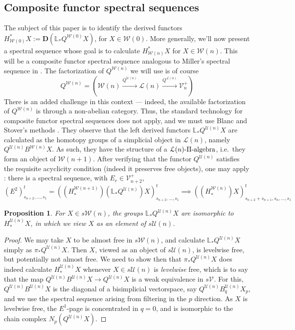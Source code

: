 \documentclass[11pt]{amsart}
\theoremstyle{plain}
\newtheorem{prop}[thm]{Proposition}
\theoremstyle{definition}
\renewcommand{\to}{\longrightarrow}
\newcommand{\calW}{\mathcal{W}}
\newcommand{\calU}{\mathcal{U}}
\newcommand{\calL}{\mathcal{L}}
\newcommand{\calV}{\mathcal{V}}
\theoremstyle{plain}
\newcommand{\vect}[2]{\calV^{#1}_{#2}}
\newcommand{\dual}{\mathbf{D}}
\begin{document}
\begin{Composite functor spectral sequences}
\vfil\pagebreak
\section{\textbf{Composite functor spectral sequences}}
The subject of this paper is to identify the derived functors $H^*_{\calW(0)}X:=\dual(\mathbb{L}_*Q^{\calW(0)}X)$, for $X\in\calW(0)$. More generally, we'll now present a spectral sequence whose goal is to calculate $H^*_{\calW(n)}X$ for $X\in\calW(n)$. This will be a composite functor spectral sequence analogous to Miller's spectral sequence in \cite{MillerSullivanConjecture.pdf}. The factorization of $Q^{\calW(n)}$ we will use is of course 
\[Q^{\calW(n)}=\left(\calW(n)\overset{Q^{\calU(n)}}{\to}\calL(n)\overset{Q^{\calL(n)}}{\to}\vect{+}{n}\right)\]
There is an added challenge in this context --- indeed, the available factorization of $Q^{\calW(n)}$ is through a non-abelian category. Thus, the standard technology for composite functor spectral sequences does not apply, and we must use Blanc and Stover's methods \cite{Blanc_Stover-Groth_SS.pdf}. They observe that the left derived functors $\mathbb{L}_*Q^{\calU(n)}X$ are calculated as the homotopy groups of a simplicial object in $\calL(n)$, namely $Q^{\calU(n)}B^{\calW(n)}X$. As such, they have the structure of a $\calL(n)\textup{-$\Pi$-algebra}$, i.e.\ they form an object of $\calW(n+1)$.  After verifying that the functor $Q^{\calU(n)}$ satisfies the requisite acyclicity condition (indeed it preserves free objects), one may apply \cite[Theorem 4.4]{Blanc_Stover-Groth_SS.pdf}: there is a spectral sequence, with $E_r\in\vect{+}{n+2}$,
\[(E^2)_{s_{n+2},\ldots,s_1}^t=((H_*^{\calW(n+1)})(\mathbb{L}_*Q^{\calU(n)})X)_{s_{n+2},\ldots,s_1}^t\implies ((H_*^{\calW(n)})X)_{s_{n+2}+s_{n+1},s_n,\ldots,s_1}^t\]
\begin{prop}
For $X\in s\calW(n)$, the groups $\mathbb{L}_*Q^{\calU(n)}X$ are isomorphic to $H_*^{\calU(n)}X$, in which we view $X$ as an element of $s\calU(n)$.
\end{prop}
\begin{proof}
We may take $X$ to be almost free in $s\calW(n)$, and calculate $\mathbb{L}_*Q^{\calU(n)}X$ simply as $\pi_*Q^{\calU(n)}X$. Then $X$, viewed as an object of $s\calU(n)$, is levelwise free, but potentially not almost free. We need to show then that $\pi_*Q^{\calU(n)}X$ does indeed calculate $H_*^{\calU(n)}X$ whenever $X\in s\calU(n)$ is \emph{levelwise} free, which is to say that the map $Q^{\calU(n)}B^{\calU(n)}X\to Q^{\calU(n)}X$ is a weak equivalence in $s\vect{}{}$. For this, $Q^{\calU(n)}B^{\calU(n)}X$ is the diagonal of a bisimplicial vectorspace, say $Q^{\calU(n)}B_q^{\calU(n)}X_p$, and we use the spectral sequence arising from filtering in the $p$ direction. As $X$ is levelwise free, the $E^1$-page is concentrated in $q=0$, and is isomorphic to the chain complex $N_p(Q^{\calU(n)}X)$.

\end{proof}
\end{Composite functor spectral sequences}
\end{document}
